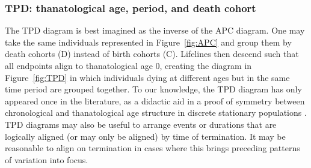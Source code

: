 \documentclass[12pt,oneside,a4paper]{article} %
\newcommand\tgh[1]{\raisebox{-.25\height}{\texttt{[image: Figures/triadtable/triad\#1.pdf]}}}
\begin{document}
\FloatBarrier
\subsubsection{TPD: thanatological age, period, and death cohort}%

The TPD diagram is best imagined as the inverse of the APC diagram. One may take
the same individuals represented in Figure~\ref{fig:APC} and group them by death cohorts (D) instead
of birth cohorts (C). Lifelines then descend such that all
endpoints align to thanatological age 0, creating the diagram in
Figure~\ref{fig:TPD} in which individuals dying at different ages but in the same time period are grouped together.
To our knowledge, the TPD diagram has only appeared once in the literature, as
a didactic aid in a proof of symmetry between chronological and thanatological
age structure in discrete stationary populations \citep{villavicencioRiffeSymmetires2016}. TPD
diagrams may also be useful to arrange events or durations that are logically
aligned (or may only be aligned) by time of termination. It may be reasonable to
align on termination in cases where this brings preceding patterns of
variation into focus.
\end{document}
